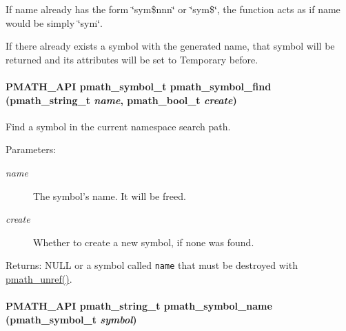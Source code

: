 If name already has the form \char`\"{}sym\$nnn\char`\"{} or \char`\"{}sym\$\char`\"{}, the function acts as if name would be simply \char`\"{}sym\char`\"{}.

If there already exists a symbol with the generated name, that symbol will be returned and its attributes will be set to Temporary before. \hypertarget{group__symbols_g597a971f788584cac3f327f1afdd5f41}{
\paragraph[{pmath\_\-symbol\_\-find}]{\setlength{\rightskip}{0pt plus 5cm}PMATH\_\-API {\bf pmath\_\-symbol\_\-t} pmath\_\-symbol\_\-find ({\bf pmath\_\-string\_\-t} {\em name}, \/  {\bf pmath\_\-bool\_\-t} {\em create})}\hfill}
\label{group__symbols_g597a971f788584cac3f327f1afdd5f41}


Find a symbol in the current namespace search path. 

\begin{Desc}
\item[Parameters:]
\begin{description}
\item[{\em name}]The symbol's name. It will be freed. \item[{\em create}]Whether to create a new symbol, if none was found. \end{description}
\end{Desc}
\begin{Desc}
\item[Returns:]NULL or a symbol called {\tt name} that must be destroyed with \hyperlink{classpmath__t_54e905402c38940687033b87eb8c6c9f}{pmath\_\-unref()}. \end{Desc}
\hypertarget{group__symbols_g286ea4e54b4bf2922c519ec5b823bf41}{
\paragraph[{pmath\_\-symbol\_\-name}]{\setlength{\rightskip}{0pt plus 5cm}PMATH\_\-API {\bf pmath\_\-string\_\-t} pmath\_\-symbol\_\-name ({\bf pmath\_\-symbol\_\-t} {\em symbol})}\hfill}
\label{group__symbols_g286ea4e54b4bf2922c519ec5b823bf41}


